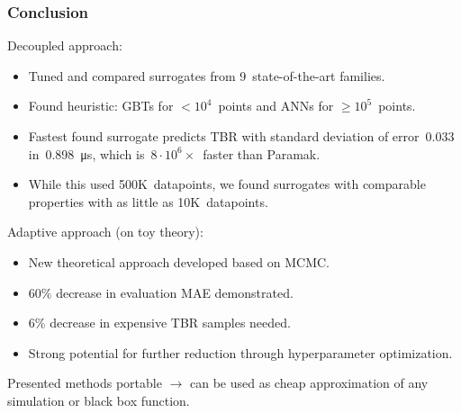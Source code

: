 \begin{frame}
	\frametitle{Conclusion}

	Decoupled approach:

	\begin{itemize}
		\item
			Tuned and compared surrogates from 9~state-of-the-art families.
		\item
			Found heuristic: GBTs for $<10^4$~points and
			ANNs for $\geq10^5$~points.
		\item
			Fastest found surrogate predicts TBR with standard deviation of
			error~$\num{0.033}$ in~\SI{0.898}{\micro\second}, which is~$8\cdot
			10^6\times$~faster than Paramak.
		\item
			While this used 500K~datapoints, we found surrogates with
			comparable properties with as little as 10K~datapoints.
	\end{itemize}

	\vspace{0.5em}

	Adaptive approach (on toy theory):
	\begin{itemize}
	    \item
	        New theoretical approach developed based on MCMC.
		\item 
			$60\%$ decrease in evaluation MAE demonstrated.
		\item
			$6\%$ decrease in expensive TBR samples needed.
		\item
			Strong potential for further reduction through hyperparameter optimization.
	\end{itemize}

	\vspace{0.5em}

	Presented methods portable $\rightarrow$ can be used as cheap
	approximation of any simulation or black box function.
\end{frame}

